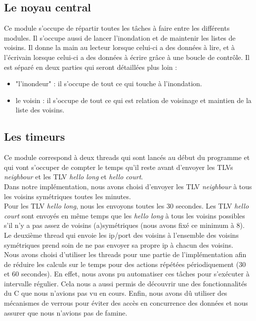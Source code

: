 \documentclass{FR16}
\begin{document}
\subsection{Le noyau central}
Ce module s'occupe de répartir toutes les tâches à faire entre les différents modules. Il s'occupe aussi de lancer l'inondation et de maintenir les listes de voisins. Il donne la main au lecteur lorsque celui-ci a des données à lire, et à l'écrivain lorsque celui-ci a des données à écrire grâce à une boucle de contrôle. Il est séparé en deux parties qui seront détaillées plus loin :
\begin{itemize}
    \item "l'inondeur" : il s'occupe de tout ce qui touche à l'inondation.
    \item le voisin : il s'occupe de tout ce qui est relation de voisinage et maintien de la liste des voisins.
\end{itemize}

\subsection{Les timeurs}
Ce module correspond à deux threads qui sont lancés au début du programme et qui vont s'occuper de compter le temps qu'il reste avant d'envoyer les TLVs \textit{neighbour} et les TLV \textit{hello long} et \textit{hello court}.\\
Dans notre implémentation, nous avons choisi d'envoyer les TLV \textit{neighbour} à tous les voisins symétriques toutes les minutes.\\
Pour les TLV \textit{hello long}, nous les envoyons toutes les 30 secondes. Les TLV \textit{hello court} sont envoyés en même temps que les \textit{hello long} à tous les voisins possibles s'il n'y a pas assez de voisins (a)symétriques (nous avons fixé ce minimum à 8). \\

Le deuxième thread qui envoie les ip/port des voisins à l'ensemble des voisins symétriques prend soin de ne pas envoyer sa propre ip à chacun des voisins.  \\

Nous avons choisi d'utiliser les threads pour une partie de l'implémentation afin de réduire les calculs sur le temps pour des actions répétées périodiquement (30 et 60 secondes). En effet, nous avons pu automatiser ces tâches pour s'exécuter à intervalle régulier. Cela nous a aussi permis de découvrir une des fonctionnalités du C que nous n'avions pas vu en cours. Enfin, nous avons dû utiliser des mécanismes de verrous pour éviter des accès en concurrence des données et nous assurer que nous n'avions pas de famine.
\end{document}
